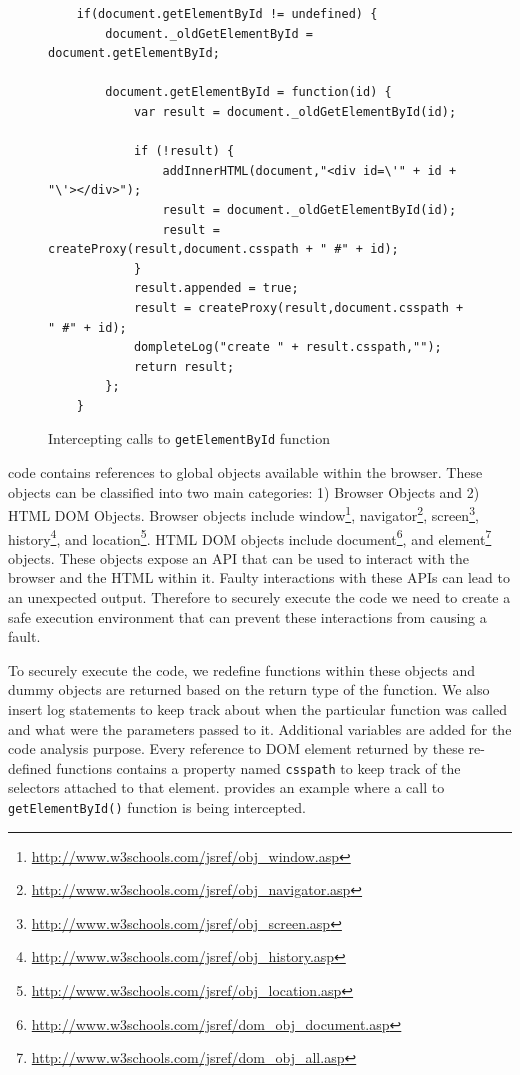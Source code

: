 		
				
			\begin{figure}
			\medskip
			\begin{lstlisting}
	if(document.getElementById != undefined) { 
		document._oldGetElementById = document.getElementById; 
			
		document.getElementById = function(id) { 
			var result = document._oldGetElementById(id); 
				
			if (!result) { 
				addInnerHTML(document,"<div id=\'" + id + "\'></div>"); 
				result = document._oldGetElementById(id); 
				result = createProxy(result,document.csspath + " #" + id); 
			} 
			result.appended = true;
			result = createProxy(result,document.csspath + " #" + id);
			dompleteLog("create " + result.csspath,"");
			return result; 
		}; 
	}
			\end{lstlisting}
			\caption{Intercepting calls to \texttt{getElementById} function}
			\label{Fig:Environment}
			\end{figure}
			
		
			\javascript code contains references to global objects available within the browser. These objects can be classified into two main categories: 1) Browser Objects and 2) HTML DOM Objects. Browser objects include window\footnote{\url{http://www.w3schools.com/jsref/obj_window.asp}}, navigator\footnote{\url{http://www.w3schools.com/jsref/obj_navigator.asp}}, screen\footnote{\url{http://www.w3schools.com/jsref/obj_screen.asp}}, history\footnote{\url{http://www.w3schools.com/jsref/obj_history.asp}},  and location\footnote{\url{http://www.w3schools.com/jsref/obj_location.asp}}. HTML DOM objects include document\footnote{\url{http://www.w3schools.com/jsref/dom_obj_document.asp}}, and element\footnote{\url{http://www.w3schools.com/jsref/dom_obj_all.asp}} objects. These objects expose an API that can be used to interact with the browser and the HTML within it. Faulty interactions with these APIs can lead to an unexpected output. Therefore to securely execute the code we need to create a safe execution environment that can prevent these interactions from causing a fault.
			
			To securely execute the \javascript code, we redefine functions within these objects and dummy objects are returned based on the return type of the function. We also insert log statements to keep track about when the particular function was called and what were the parameters passed to it. Additional variables are added for the code analysis purpose. Every reference to DOM element returned by these re-defined functions contains a property named \texttt{csspath} to keep track of the \css selectors attached to that element.  provides an example where a call to \texttt{getElementById()} function is being intercepted.

